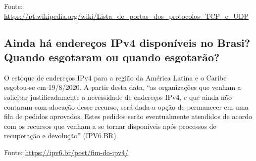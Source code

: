 \documentclass{article}
\begin{document}
Fonte: \url{https://pt.wikipedia.org/wiki/Lista_de_portas_dos_protocolos_TCP_e_UDP}

\subsection{Ainda há endereços IPv4 disponíveis no Brasi? Quando esgotaram ou quando esgotarão?}
O estoque de endereços IPv4 para a região da América Latina e o Caribe esgotou-se em 19/8/2020. 
A partir desta data, “as organizações que venham a solicitar justificadamente a necessidade de endereços IPv4, e que ainda não contaram com alocação desse recurso, será dada a opção de permanecer em uma fila de pedidos aprovados. Estes pedidos serão eventualmente atendidos de acordo com os recursos que venham a se tornar disponíveis após processos de recuperação e devolução” (IPV6.BR).

Fonte: \url{https://ipv6.br/post/fim-do-ipv4/}
\end{document}
